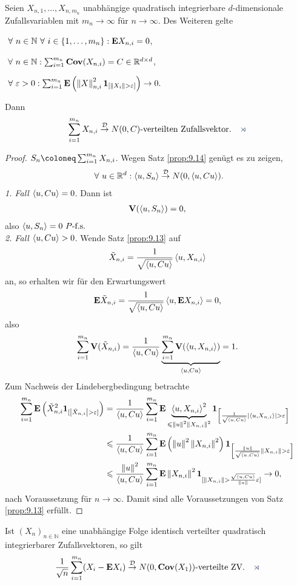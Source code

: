 \begin{prop}
\label{prop:9.15}
Seien $X_{n,1},\ldots,X_{n,m_n}$ unabhängige quadratisch
integrierbare $d$-dimensionale Zufallsvariablen mit $m_n\to \infty$ für
$n\to\infty$. Des Weiteren gelte
\begin{defnpropenum}
\item $\forall n\in\N \forall i\in\setd{1,\ldots,m_n} :
\E X_{n,i}=0$,
\item $\forall n\in\N  : \sum_{i=1}^{m_n} \Cov(X_{n,i}) =
C \in \R^{d\times d}$,
\item  $\forall \ep > 0 :
\sum^{m_n}_{i=1} \E\left(\norm{X}^{2}_{n,i}\Id_{ [\norm{X_{i}} >
\ep]} \right) \to 0.$
\end{defnpropenum}
Dann
\begin{align*}
\sum\limits^{m_n}_{i=1}X_{n,i}\Dto
N(0,C)\text{-verteilten Zufallsvektor}.\fishhere
\end{align*}
\end{prop}
\begin{proof}
$S_n\defl\sum_{i=1}^{m_n} X_{n,i}$. Wegen Satz \ref{prop:9.14} genügt es zu zeigen,
\begin{align*}
\forall u\in\R^d : \lin{u,S_n}\Dto N(0,\lin{u,Cu}).
\end{align*}
\textit{1. Fall} $\left\langle u,Cu\right\rangle = 0$. Dann ist
\begin{align*}
\textbf{V}(\left\langle u,S_n\right\rangle) = 0,
\end{align*}
also $\left\langle u,S_n\right\rangle=0\ P\text{-f.s.}$\\
\textit{2. Fall} $\left\langle u,Cu\right\rangle > 0$. Wende Satz \ref{prop:9.13} auf
\begin{align*}
\tilde{X}_{n,i} = \frac{1}{\sqrt{\left\langle u,Cu\right\rangle}}\left\langle u,X_{n,i}\right\rangle
\end{align*}
an, so erhalten wir für den Erwartungswert
\begin{align*}
\textbf{E} \tilde{X}_{n,i} = \frac{1}{\sqrt{\left\langle u,Cu\right\rangle}}\left\langle u,\textbf{E} X_{n,i}\right\rangle = 0,
\end{align*}  
also
\begin{align*}
\sum_{i=1}^{m_n} \textbf{V}(\tilde{X}_{n,i}) =
\frac{1}{\left\langle u,Cu\right\rangle}\underbrace{\sum_{i=1}^{m_n}\textbf{V}(\left\langle u,X_{n,i}\right\rangle)}_{\left\langle u,Cu\right\rangle}
= 1.
\end{align*}
Zum Nachweis der Lindebergbedingung betrachte
\begin{align*}
\sum_{i=1}^{m_n} \E \left( \tilde{X}_{n,i}^2\Id_{[\abs{\tilde{X}_{n,i}}>\ep]}
\right) &=
\frac{1}{\lin{u,Cu}}
\sum_{i=1}^{m_n} \E
\underbrace{\lin{u,X_{n,i}}^2}_{\le\norm{u}^2\norm{X_{n,i}}^2}
\Id_{\left[\frac{1}{\sqrt{\lin{u,Cu}}}\abs{\lin{u,X_{n,i}}}
>\ep \right]}\\
&\le
\frac{1}{\lin{u,Cu}}
\sum_{i=1}^{m_n} \E\left(\norm{u}^2\norm{X_{n,i}}^2\right)
\Id_{\left[\frac{\norm{u}}{\sqrt{\lin{u,Cu}}}\norm{X_{n,i}}
>\ep \right]}\\
&\le
\frac{\norm{u}^2}{\lin{u,Cu}}\sum_{i=1}^{m_n}\E \norm{X_{n,i}}^2
\Id_{[\norm{X_{n,i}} > \frac{\sqrt{\lin{u,Cu}}}{\norm{u}}\ep]}
\to 0,
\end{align*}
nach Voraussetzung für $n\to\infty$. Damit sind alle Voraussetzungen von Satz
\ref{prop:9.13} erfüllt.\qedhere
\end{proof}
\begin{cor}
\label{cor:9.3}
Ist $(X_n)_{n\in\mathbb{N}}$ eine unabhängige Folge
  identisch verteilter quadratisch integrierbarer Zufallsvektoren, so gilt
\begin{align*}
\frac{1}{\sqrt{n}} \sum\limits^{m_n}_{i=1}(X_{i}-\E X_i)
\Dto N(0,\Cov(X_1))\text{-verteilte ZV}.\fishhere
\end{align*}
\end{cor}